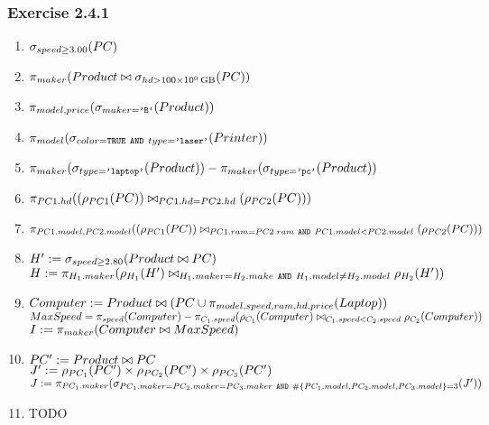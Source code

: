 \documentclass{bdad}
\begin{document}
\subsubsection{Exercise 2.4.1}
\begin{enumerate}[label=\alph*)]
    \item $\sigma_{speed \geq 3.00}({PC})$
    \item $\project{maker}{Product \naturaljoin \select{hd > \SI{100}{\giga\byte}}{PC}}$
    \item $\pi_{model, price}({\sigma_{maker=\texttt{'B'}}({Product})})$
    \item $\pi_{model}({\sigma_{color=\texttt{TRUE} ~\texttt{AND}~ type=\texttt{'laser'}}({Printer})})$
    \item $\pi_{maker}({\sigma_{type=\texttt{'laptop'}}({Product})}) - \pi_{maker}({\sigma_{type=\texttt{'pc'}}({Product})})$
    \item $\pi_{PC1.hd}({(\rho_{PC1}({PC})) \bowtie_{PC1.hd = PC2.hd} (\rho_{PC2}({PC}))})$
    \item $\pi_{PC1.model, PC2.model}({(\rho_{PC1}({PC})) \bowtie_{PC1.ram=PC2.ram ~\texttt{AND}~ PC1.model < PC2.model} (\rho_{PC2}({PC}))})$
    \item $H' := \sigma_{speed \geq 2.80}({Product \bowtie PC})$ \\
    $H :=\pi_{H_1.maker}({\rho_{H_1}({H'}) \bowtie_{H_1.maker=H_2.make ~\texttt{AND}~ H_1.model \neq H_2.model} \rho_{H_2}({H'})})$
    \item $Computer := Product \bowtie (PC \cup \pi_{model, speed, ram, hd, price}({Laptop}))$ \\
    $MaxSpeed = \pi_{speed}({Computer}) - \pi_{C_1.speed}({\rho_{C_1}({Computer}) \bowtie_{C_1.speed < C_2.speed} \rho_{C_2}({Computer})})$ \\
    $I := \pi_{maker}({Computer \bowtie MaxSpeed})$
    \item $PC' := Product \bowtie PC$ \\
    $J' := \rho_{PC_1}({PC'}) \times \rho_{PC_2}({PC'}) \times \rho_{PC_3}({PC'})$ \\
    $J := \pi_{PC_1.maker}({\sigma_{PC_1.maker=PC_2.maker=PC_3.maker ~\texttt{AND}~ \#\{PC_1.model, PC_2.model, PC_3.model\}=3}({J'})})$
    \item TODO
\end{enumerate}
\end{document}
